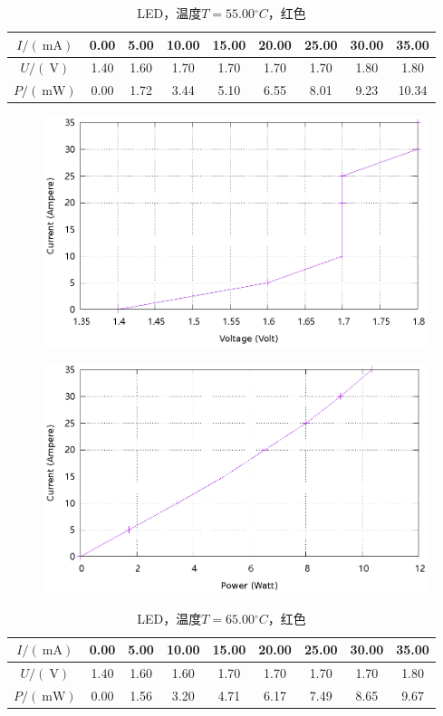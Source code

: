 \documentclass{ctexart}
\newcommand{\si}[1]{\  \mathrm{#1}}
\begin{document}
\newpage
\begin{table}[H]
    \centering
    \begin{tabular}{|c|c|c|c|c|c|c|c|c|}
        \hline
        $I/(\si{mA})$   & 0.00 & 5.00 & 10.00 & 15.00 & 20.00 & 25.00 & 30.00 & 35.00 \\\hline
        $U / (\si{V})$  & 1.40 & 1.60 & 1.70 & 1.70 & 1.70 & 1.70 & 1.80 & 1.80 \\\hline
        $P / (\si{mW})$ & 0.00 & 1.72 & 3.44 & 5.10 & 6.55 & 8.01 & 9.23 & 10.34 \\\hline
    \end{tabular}
    \caption{LED，温度$T=55.00{}^{\circ}C$，红色}
\end{table}
\begin{figure}[H]
    \centering
    \includegraphics[width=0.9\linewidth]{../output/led-vc-7.gnuplot}
\end{figure}
\begin{figure}[H]
    \centering
    \includegraphics[width=0.9\linewidth]{../output/led-pc-7.gnuplot}
\end{figure}
\newpage
\begin{table}[H]
    \centering
    \begin{tabular}{|c|c|c|c|c|c|c|c|c|}
        \hline
        $I/(\si{mA})$   & 0.00 & 5.00 & 10.00 & 15.00 & 20.00 & 25.00 & 30.00 & 35.00 \\\hline
        $U / (\si{V})$  & 1.40 & 1.60 & 1.60 & 1.70 & 1.70 & 1.70 & 1.70 & 1.80 \\\hline
        $P / (\si{mW})$ & 0.00 & 1.56 & 3.20 & 4.71 & 6.17 & 7.49 & 8.65 & 9.67 \\\hline
    \end{tabular}
    \caption{LED，温度$T=65.00{}^{\circ}C$，红色}
\end{table}
\end{document}
